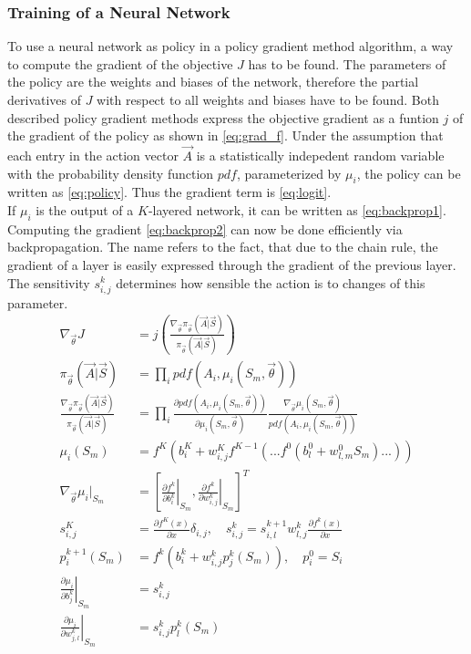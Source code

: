 \subsubsection{Training of a Neural Network}
To use a neural network as policy in a policy gradient method algorithm, a way to compute the gradient of the objective $J$ has to be found. The parameters of the policy are the weights and biases of the network, therefore the partial derivatives of $J$ with respect to all weights and biases have to be found. Both described policy gradient methods express the objective gradient as a funtion $j$ of the gradient of the policy as shown in \eqref{eq:grad_f}. Under the assumption that each entry in the action vector $\vec{A}$ is a statistically indepedent random variable with the probability density function $pdf$, parameterized by $\mu_i$, the policy can be written as \eqref{eq:policy}. Thus the gradient term is \eqref{eq:logit}. \cite[p. 335]{sutton_reinforcement_2018}\\
If $\mu_i$ is the output of a $K$-layered network, it can be written as \eqref{eq:backprop1}.
Computing the gradient \eqref{eq:backprop2} can now be done efficiently via backpropagation. The name refers to the fact, that due to the chain rule, the gradient of a layer is easily expressed through the gradient of the previous layer. The sensitivity $s^k_{i,j}$ determines how sensible the action is to changes of this parameter. \cite[p.11-7 - 11-13]{demuth_neural_2014}
\begin{align}
	\nabla_{\vec{\theta}} J &= j\left(\frac{\nabla_{\vec{\theta}}\pi_{\vec{\theta}}(\vec{A}|\vec{S})} {\pi_{\vec{\theta}}(\vec{A}|\vec{S})}\right) \label{eq:grad_f}\\
	\pi_{\vec{\theta}}(\vec{A}|\vec{S}) &= \prod_i pdf(A_i, \mu_i(S_m,\vec{\theta})) \label{eq:policy}\\	\frac{\nabla_{\vec{\theta}}\pi_{\vec{\theta}}(\vec{A}|\vec{S})} {\pi_{\vec{\theta}}(\vec{A}|\vec{S})} &= \prod_i \frac{\partial pdf(A_i, \mu_i(S_m,\vec{\theta}))}{\partial \mu_i(S_m, \vec{\theta})} \frac{\nabla_{\vec{\theta}} \mu_i(S_m,\vec{\theta})}{pdf(A_i, \mu_i(S_m, \vec{\theta}))} \label{eq:logit}\\
	\mu_i(S_m) &= f^K ( b^K_i+w^K_{i,j} f^{K-1} (...f^{0}(b^0_l + w^0_{l,m}S_m)...)) \label{eq:backprop1} \\
	\nabla_{\vec{\theta}} \mu_i |_{S_m} &= \left[\left. \frac{\partial f^k}{\partial b^k_i} \right|_{S_m}, 
	\left.\frac{\partial f^k}{\partial w^k_{i,j}}\right|_{S_m} \right]^T \label{eq:backprop2}\\
	s^K_{i,j} &= \frac{\partial f^K(x)}{\partial x} \delta_{i,j}, \quad s^{k}_{i,j} = s^{k+1}_{i,l} w^k_{l,j} \frac{\partial f^k(x)}{\partial x} \\
	p^{k+1}_i(S_m) &= f^{k}(b^{k}_i + w^{k}_{i,j} p^{k}_j(S_m)), \quad p^0_i = S_i \\
	\left. \frac{\partial \mu_i}{\partial b^k_j}\right|_{S_m} &= s^k_{i,j} \\
	\left. \frac{\partial \mu_i}{\partial w^k_{j,l}} \right|_{S_m} &= s^k_{i,j} p^k_l(S_m)
\end{align}